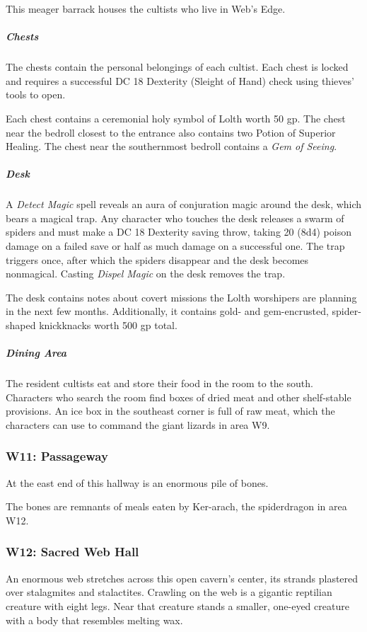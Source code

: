 \documentclass[10pt,a4paper,twoside,bg=print,twocolumn,openany,nodeprecatedcode]{dndbook}
\begin{document}
This meager barrack houses the cultists who live in Web's Edge.

\subparagraph{Chests}
The chests contain the personal belongings of each cultist. Each chest is locked and requires a successful DC 18 Dexterity (Sleight of Hand) check using thieves' tools to open.

Each chest contains a ceremonial holy symbol of Lolth worth 50 gp. The chest near the bedroll closest to the entrance also contains two Potion of Superior Healing. The chest near the southernmost bedroll contains a \textit{Gem of Seeing}.

\subparagraph{Desk}
A \textit{Detect Magic} spell reveals an aura of conjuration magic around the desk, which bears a magical trap. Any character who touches the desk releases a swarm of spiders and must make a DC 18 Dexterity saving throw, taking 20 (8d4) poison damage on a failed save or half as much damage on a successful one. The trap triggers once, after which the spiders disappear and the desk becomes nonmagical. Casting \textit{Dispel Magic} on the desk removes the trap.

The desk contains notes about covert missions the Lolth worshipers are planning in the next few months. Additionally, it contains gold- and gem-encrusted, spider-shaped knickknacks worth 500 gp total.

\subparagraph{Dining Area}
The resident cultists eat and store their food in the room to the south. Characters who search the room find boxes of dried meat and other shelf-stable provisions. An ice box in the southeast corner is full of raw meat, which the characters can use to command the giant lizards in area W9.

\subsubsection{W11: Passageway}
\begin{DndReadAloud}{}
At the east end of this hallway is an enormous pile of bones.

\end{DndReadAloud}

The bones are remnants of meals eaten by Ker-arach, the spiderdragon in area W12.

\subsubsection{W12: Sacred Web Hall}
\begin{DndReadAloud}{}
An enormous web stretches across this open cavern's center, its strands plastered over stalagmites and stalactites. Crawling on the web is a gigantic reptilian creature with eight legs. Near that creature stands a smaller, one-eyed creature with a body that resembles melting wax.

\end{DndReadAloud}
\end{document}
